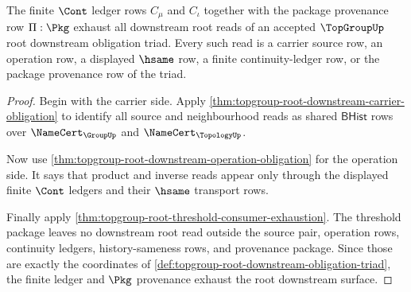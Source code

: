 \begin{theorem}
\label{thm:topgroup-root-downstream-ledger-obligation}
The finite $\Cont$ ledger rows $C_{\mu}$ and $C_{\iota}$ together with the
package provenance row $\Pi:\Pkg$ exhaust all downstream root reads of an
accepted $\TopGroupUp$ root downstream obligation triad. Every such read is a
carrier source row, an operation row, a displayed $\hsame$ row, a finite
continuity-ledger row, or the package provenance row of the triad.
\end{theorem}
\begin{proof}
Begin with the carrier side. Apply
\autoref{thm:topgroup-root-downstream-carrier-obligation} to identify all source
and neighbourhood reads as shared $\mathsf{BHist}$ rows over
$\NameCert_{\GroupUp}$ and $\NameCert_{\TopologyUp}$.

Now use
\autoref{thm:topgroup-root-downstream-operation-obligation} for the operation
side. It says that product and inverse reads appear only through the displayed
finite $\Cont$ ledgers and their $\hsame$ transport rows.

Finally apply \autoref{thm:topgroup-root-threshold-consumer-exhaustion}. The
threshold package leaves no downstream root read outside the source pair,
operation rows, continuity ledgers, history-sameness rows, and provenance
package. Since those are exactly the coordinates of
\autoref{def:topgroup-root-downstream-obligation-triad}, the finite ledger and
$\Pkg$ provenance exhaust the root downstream surface.
\end{proof}

